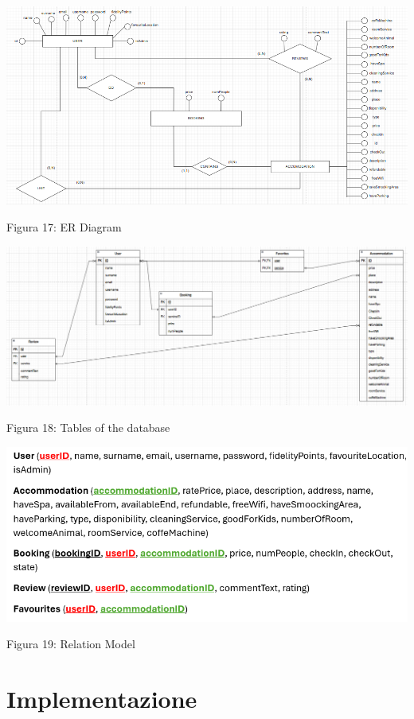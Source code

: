 \documentclass[10pt]{article}
\begin{document}
\begin{center}
\par\medskip
\includegraphics[scale=0.6]{ERImages/finalER}
\par\medskip
Figura 17: ER Diagram
\par\medskip
\includegraphics[scale=0.5]{ERImages/finaleTablesER}
\par\medskip
Figura 18: Tables of the database
\par\medskip
\includegraphics[scale=1]{ERImages/RelationalModel}
\par\medskip
Figura 19: Relation Model
\par\medskip
\end{center}

\section{Implementazione}
\end{document}
